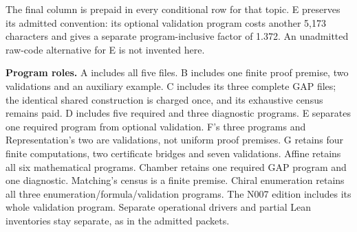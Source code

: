 \documentclass[11pt,a4paper]{article}
\begin{document}
The final column is prepaid in every conditional row for that topic. E preserves its admitted convention: its optional validation program costs another 5,173 characters and gives a separate program-inclusive factor of 1.372. An unadmitted raw-code alternative for E is not invented here.

\textbf{Program roles.} A includes all five files. B includes one finite proof premise, two validations and an auxiliary example. C includes its three complete GAP files; the identical shared construction is charged once, and its exhaustive census remains paid. D includes five required and three diagnostic programs. E separates one required program from optional validation. F's three programs and Representation's two are validations, not uniform proof premises. G retains four finite computations, two certificate bridges and seven validations. Affine retains all six mathematical programs. Chamber retains one required GAP program and one diagnostic. Matching's census is a finite premise. Chiral enumeration retains all three enumeration/formula/validation programs. The N007 edition includes its whole validation program. Separate operational drivers and partial Lean inventories stay separate, as in the admitted packets.
\end{document}
